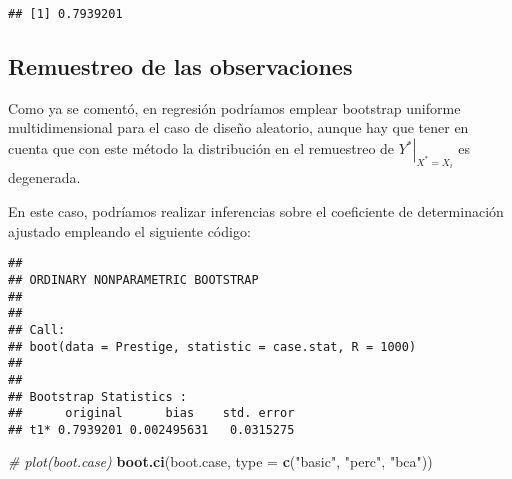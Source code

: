 \documentclass[
]{book}
\newenvironment{Shaded}{\begin{snugshade}}{\end{snugshade}}
\newcommand{\CommentTok}[1]{\textcolor[rgb]{0.56,0.35,0.01}{\textit{#1}}}
\newcommand{\ControlFlowTok}[1]{\textcolor[rgb]{0.13,0.29,0.53}{\textbf{#1}}}
\newcommand{\DataTypeTok}[1]{\textcolor[rgb]{0.13,0.29,0.53}{#1}}
\newcommand{\DecValTok}[1]{\textcolor[rgb]{0.00,0.00,0.81}{#1}}
\newcommand{\KeywordTok}[1]{\textcolor[rgb]{0.13,0.29,0.53}{\textbf{#1}}}
\newcommand{\NormalTok}[1]{#1}
\newcommand{\OperatorTok}[1]{\textcolor[rgb]{0.81,0.36,0.00}{\textbf{#1}}}
\newcommand{\StringTok}[1]{\textcolor[rgb]{0.31,0.60,0.02}{#1}}
\theoremstyle{break}
\theoremstyle{definition}
\theoremstyle{definition}
\theoremstyle{definition}
\theoremstyle{remark}
\begin{document}
\begin{verbatim}
## [1] 0.7939201
\end{verbatim}

\hypertarget{boot-unif-reg}{%
\subsection{Remuestreo de las observaciones}\label{boot-unif-reg}}

Como ya se comentó, en regresión podríamos emplear bootstrap uniforme multidimensional para el caso de diseño aleatorio, aunque hay que tener en cuenta que con este método la distribución en el remuestreo de \(\left. Y^{\ast}\right\vert _{X^{\ast}=X_i}\) es degenerada.

En este caso, podríamos realizar inferencias sobre el coeficiente de determinación ajustado empleando el siguiente código:

\begin{Shaded}
\end{Shaded}

\begin{verbatim}
## 
## ORDINARY NONPARAMETRIC BOOTSTRAP
## 
## 
## Call:
## boot(data = Prestige, statistic = case.stat, R = 1000)
## 
## 
## Bootstrap Statistics :
##      original      bias    std. error
## t1* 0.7939201 0.002495631   0.0315275
\end{verbatim}

\begin{Shaded}
\begin{Highlighting}[]
\CommentTok{# plot(boot.case)}
\KeywordTok{boot.ci}\NormalTok{(boot.case, }\DataTypeTok{type =} \KeywordTok{c}\NormalTok{(}\StringTok{"basic"}\NormalTok{, }\StringTok{"perc"}\NormalTok{, }\StringTok{"bca"}\NormalTok{))}
\end{Highlighting}
\end{Shaded}
\end{document}
